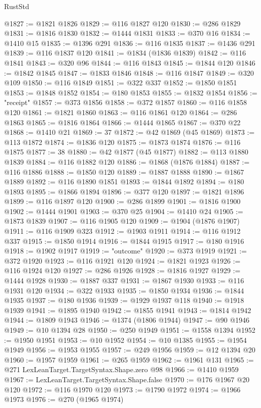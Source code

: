 \begin{lexlean}{RustStd}
\begin{coremodule}
@1827 := @1821 @1826
@1829 := @116 @1827 @120
@1830 := @286 @1829
@1831 := @1816 @1830
@1832 := @1444 @1831
@1833 := @370 @16
@1834 := @1410 @15
@1835 := @1396 @291
@1836 := @116 @1835
@1837 := @1436 @291
@1839 := @116 @1837 @120
@1841 := @1834 (@1836 @1839)
@1842 := @116 @1841
@1843 := @320 @96
@1844 := @116 @1843
@1845 := @1844 @120
@1846 := @1842 @1845
@1847 := @1833 @1846
@1848 := @116 @1847
@1849 := @320 @109
@1850 := @116 @1849
@1851 := @322 @337
@1852 := @1850 @1851
@1853 := @1848 @1852
@1854 := @180 @1853
@1855 := @1832 @1854
@1856 := "receipt"
@1857 := @373 @1856
@1858 := @372 @1857
@1860 := @116 @1858 @120
@1861 := @1821 @1860
@1863 := @116 @1861 @120
@1864 := @286 @1863
@1865 := @1816 @1864
@1866 := @1444 @1865
@1867 := @370 @22
@1868 := @1410 @21
@1869 := 37
@1872 := @42 @1869 (@45 @1869)
@1873 := @113 @1872
@1874 := @1836 @120
@1875 := @1873 @1874
@1876 := @116 @1875
@1877 := 38
@1880 := @42 @1877 (@45 @1877)
@1882 := @113 @1880 @1839
@1884 := @116 @1882 @120
@1886 := @1868 (@1876 @1884)
@1887 := @116 @1886
@1888 := @1850 @120
@1889 := @1887 @1888
@1890 := @1867 @1889
@1892 := @116 @1890 @1851
@1893 := @1844 @1892
@1894 := @180 @1893
@1895 := @1866 @1894
@1896 := @377 @120
@1897 := @1821 @1896
@1899 := @116 @1897 @120
@1900 := @286 @1899
@1901 := @1816 @1900
@1902 := @1444 @1901
@1903 := @370 @25
@1904 := @1410 @24
@1905 := @1873 @1839
@1907 := @116 @1905 @120
@1909 := @1904 (@1876 @1907)
@1911 := @116 @1909 @323
@1912 := @1903 @1911
@1914 := @116 @1912 @337
@1915 := @1850 @1914
@1916 := @1844 @1915
@1917 := @180 @1916
@1918 := @1902 @1917
@1919 := "outcome"
@1920 := @373 @1919
@1921 := @372 @1920
@1923 := @116 @1921 @120
@1924 := @1821 @1923
@1926 := @116 @1924 @120
@1927 := @286 @1926
@1928 := @1816 @1927
@1929 := @1444 @1928
@1930 := @1887 @337
@1931 := @1867 @1930
@1933 := @116 @1931 @120
@1934 := @322 @1933
@1935 := @1850 @1934
@1936 := @1844 @1935
@1937 := @180 @1936
@1939 := @1929 @1937 @118
@1940 := @1918 @1939
@1941 := @1895 @1940
@1942 := @1855 @1941
@1943 := @1814 @1942
@1944 := @1809 @1943
@1946 := @1374 (@1806 @1944)
@1947 := @90 @1946
@1949 := @10 @1394 @28
@1950 := @250 @1949
@1951 := @1558 @1394
@1952 := @1950 @1951
@1953 := @10 @1952
@1954 := @10 @1385
@1955 := @1954 @1949
@1956 := @1953 @1955
@1957 := @249 @1956
@1959 := @12 @1394 @20
@1960 := @1957 @1959
@1961 := @265 @1959
@1962 := @1961 @131
@1965 := @271 LexLeanTarget.TargetSyntax.Shape.zero @98
@1966 := @1410 @1959
@1967 := LexLeanTarget.TargetSyntax.Shape.false
@1970 := @176 @1967 @20 @120
@1972 := @116 @1970 @120
@1973 := @1790 @1972
@1974 := @1966 @1973
@1976 := @270 (@1965 @1974)

\end{coremodule}
\end{lexlean}
